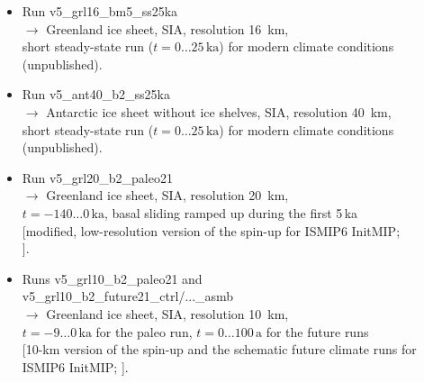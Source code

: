 \documentclass[12pt,a4paper]{article}
\begin{document}
\begin{itemize}
\begin{itemize}
\item
Run v5\_grl16\_bm5\_ss25ka
\\
$\longrightarrow$ Greenland ice sheet, SIA, resolution 16~km,
\\
\phantom{$\longrightarrow$} short steady-state run ($t=0\ldots{}25\,\mathrm{ka}$) for modern climate conditions
\\
\phantom{$\longrightarrow$} (unpublished).

\item
Run v5\_ant40\_b2\_ss25ka 
\\
$\longrightarrow$ Antarctic ice sheet without ice shelves, SIA, resolution 40~km,
\\
\phantom{$\longrightarrow$} short steady-state run ($t=0\ldots{}25\,\mathrm{ka}$) for modern climate conditions
\\
\phantom{$\longrightarrow$} (unpublished).

\item
Run v5\_grl20\_b2\_paleo21
\\
$\longrightarrow$ Greenland ice sheet, SIA, resolution 20~km,
\\
\phantom{$\longrightarrow$} $t=-140\ldots{}0\,\mathrm{ka}$, basal sliding ramped up during the first 5\,ka
\\
\phantom{$\longrightarrow$} [modified, low-resolution version of the spin-up for ISMIP6 InitMIP; 
\\
\phantom{$\longrightarrow$} \citet{greve_etal_2017a}].

\item
Runs v5\_grl10\_b2\_paleo21 and
\\{}
\phantom{Runs} v5\_grl10\_b2\_future21\_ctrl/...\_asmb
\\
$\longrightarrow$ Greenland ice sheet, SIA, resolution 10~km,
\\
\phantom{$\longrightarrow$} $t=-9\ldots{}0\,\mathrm{ka}$ for the paleo run, $t=0\ldots{}100\,\mathrm{a}$ for the future runs
\\{}
\phantom{$\longrightarrow$} [10-km version of the spin-up and the schematic future climate runs for 
\\
\phantom{$\longrightarrow$} ISMIP6 InitMIP; \citet{greve_etal_2017a}].


\end{itemize}
\end{itemize}
\end{document}
